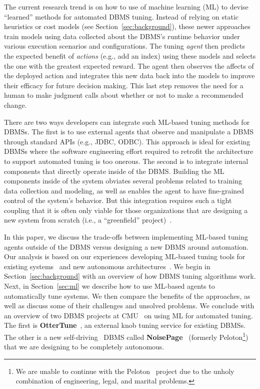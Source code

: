 \documentclass[11pt,times]{article}
\newcommand{\ottertune}{OtterTune\xspace}
\newcommand{\noisepage}{NoisePage\xspace}
\begin{document}
The current research trend is on how to use of machine learning (ML) to devise 
``learned'' methods for automated DBMS tuning. 
Instead of relying on static heuristics or cost models (see Section~\ref{sec:background}), these newer 
approaches train models using data collected about the DBMS's runtime behavior under various 
execution scenarios and configurations. The tuning \textit{agent} then predicts the expected benefit 
of \textit{actions} (e.g., add an index) using these models and selects the one with the greatest 
expected reward. The agent then observes the affects of the deployed action and integrates this new 
data 
back into the models to improve their efficacy for future decision making.
This last step removes the need for a human to make judgment calls about whether or not to make a 
recommended change.

There are two ways developers can integrate such ML-based tuning methods for DBMSs. The first is to 
use external agents that observe and manipulate a DBMS through standard 
APIs (e.g., JDBC, ODBC). This approach is ideal for existing DBMSs where the 
software engineering effort required to retrofit the architecture to support automated tuning is 
too onerous. The second is to integrate internal components that directly operate inside of the 
DBMS. Building the ML components inside of the system obviates several problems 
related to training data collection and modeling, as well as enables the agent to have fine-grained 
control of the system's behavior. But this integration requires such a tight coupling that it is 
often only viable for those organizations that are designing a new system from 
scratch (i.e., a ``greenfield'' project)~\cite{pavlo19}.

In this paper, we discuss the trade-offs between implementing ML-based tuning agents outside of the 
DBMS versus designing a new DBMS around automation.
Our analysis is based on our experiences developing 
ML-based tuning tools for existing systems~\cite{vanaken17,zhang18-ottertune,pavlo12} and new 
autonomous architectures~\cite{arulraj16,ma18,pavlo17,pavlo11,zhang18-icde}.
We begin in Section~\ref{sec:background} with an overview of how DBMS tuning algorithms work. Next, in 
Section~\ref{sec:ml} we describe how to use ML-based agents to automatically tune systems.
We then compare the benefits of the approaches, as well as discuss 
some of their challenges and unsolved problems.
We conclude with an overview of two DBMS projects at CMU~\cite{cmu-db} on using ML 
for automated tuning. The first is \textbf{\ottertune}~\cite{ottertune}, an external knob tuning 
service for existing DBMSs. The other is a new self-driving~\cite{pavlo17} DBMS called 
\textbf{\noisepage}~\cite{noisepage} (formerly Peloton\footnote{We are unable to continue with 
    the Peloton~\cite{peloton} project due to the unholy combination of engineering, legal, and 
marital problems.}) that we are designing to be 
completely autonomous.
\end{document}
